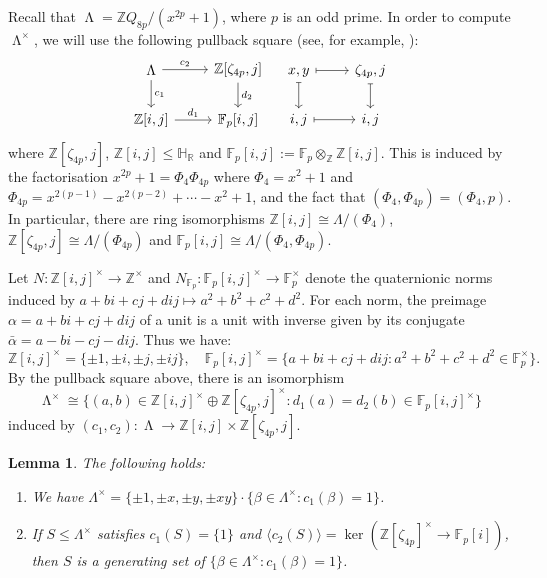\documentclass[11pt,leqno,a4paper]{amsart}
\newcommand{\R}{\mathbb{R}}
\newcommand{\Z}{\mathbb{Z}}
\renewcommand{\H}{\mathbb{H}}
\newcommand{\F}{\mathbb{F}}
\DeclareMathOperator{\LL}{\Lambda}
\newtheorem{lemma}[thm]{Lemma}
\theoremstyle{definition}
\theoremstyle{remark}
\theoremstyle{custom}
\renewcommand{\l}{\Lambda}
\newenvironment{clist}[1]
{\begin{enumerate}[\normalfont #1]}
{\end{enumerate}}
\begin{document}
Recall that $\LL = \Z Q_{8p}/(x^{2p}+1)$, where $p$ is an odd prime. In order to compute $\LL^\times$, we will use the following pullback square (see, for example, \cite[p115]{Sw83}):
\begin{equation}
\begin{tikzcd}
	\LL \ar[r,"c_2"] \ar[d,"c_1"] & \Z[\zeta_{4p},j] \ar[d,"d_2"] \\
	\Z[i,j] \ar[r,"d_1"] & \F_p[i,j] 
\end{tikzcd} \quad 
\begin{tikzcd}
	x,y \ar[r,mapsto] \ar[d,mapsto] & \zeta_{4p},j \ar[d,mapsto] \\
	i,j \ar[r,mapsto] & i,j 
\end{tikzcd}
\label{eq:square2}
\end{equation}
where $\Z[\zeta_{4p},j]$, $\Z[i,j] \le \H_{\R}$ and $\F_p[i,j] := \F_p \otimes_{\Z} \Z[i,j]$. This is induced by the factorisation $x^{2p}+1 = \Phi_4  \Phi_{4p}$ where $\Phi_4 = x^2+1$ and $\Phi_{4p} = x^{2(p-1)}-x^{2(p-2)}+ \cdots -x^2+1$, and the fact that $(\Phi_4,\Phi_{4p}) = (\Phi_4,p)$. In particular, there are ring isomorphisms $\Z[i,j] \cong \l/(\Phi_4)$, $\Z[\zeta_{4p},j] \cong \l/(\Phi_{4p})$ and $\F_p[i,j] \cong \l/(\Phi_4,\Phi_{4p})$. 

Let $N : \Z[i,j]^\times \to \Z^\times$ and $N_{\F_p} : \F_p[i,j]^\times \to \F_p^\times$ denote the quaternionic norms induced by $a+bi+cj+dij \mapsto a^2+b^2+c^2+d^2$. 
For each norm, the preimage $\alpha = a+bi+cj+dij$ of a unit is a unit with inverse given by its conjugate $\bar{\alpha} = a-bi-cj-dij$. Thus we have:
\[ \Z[i,j]^\times = \{\pm 1, \pm i, \pm j, \pm ij\}, \quad \F_p[i,j]^\times =  \{a+bi+cj+dij : a^2+b^2+c^2+d^2 \in \F_p^\times \}. \]
By the pullback square above, there is an isomorphism 
\[\LL^\times \cong \{ (a,b) \in \Z[i,j]^\times \oplus \Z[\zeta_{4p},j]^\times : d_1(a) = d_2(b) \in \F_p[i,j]^\times\} \]
induced by $(c_1,c_2) : \LL \to \Z[i,j] \times \Z[\zeta_{4p},j]$.

\begin{lemma}\label{lemma:helpergeneral2}
The following holds:
\begin{clist}{(i)}
    \item
We have $\l^\times = \{\pm 1, \pm x, \pm y, \pm xy\} \cdot \{ \beta \in \l^\times : c_1(\beta)=1\}$.
\item
    If $S \le \Lambda^\times$ satisfies $c_1(S) = \{1 \}$ and $\langle c_2(S) \rangle = \ker(\Z[\zeta_{4p}]^\times \to \F_p[i])$, then $S$ is a generating set of $\{ \beta \in \l^\times : c_1(\beta)=1\}$.
\end{clist}
\end{lemma}
\end{document}
